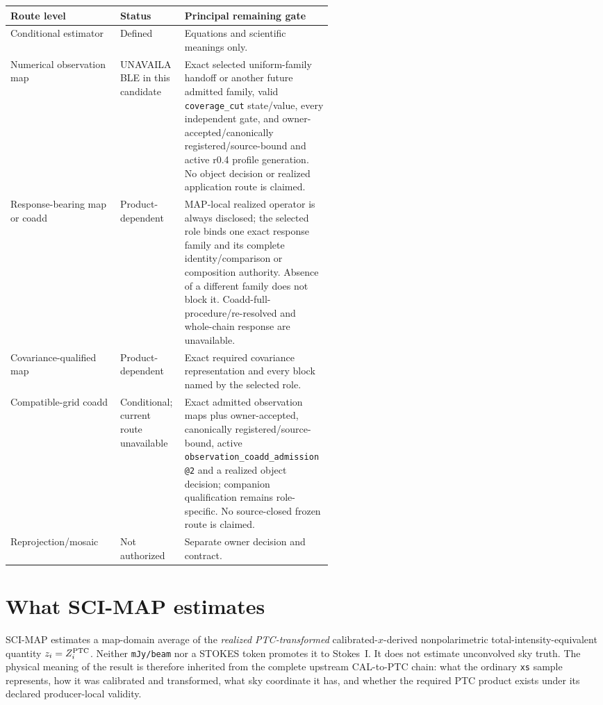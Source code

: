 \documentclass[10pt]{article}
\newcommand{\code}[1]{\nolinkurl{#1}}
\begin{document}
\begin{center}\small
\begin{tabularx}{0.96\linewidth}{@{}L{0.34\linewidth}L{0.20\linewidth}Y@{}}
\toprule Route level & Status & Principal remaining gate \\
\midrule
Conditional estimator & Defined & Equations and scientific meanings only.\\
Numerical observation map & UNAVAILABLE in this candidate & Exact selected uniform-family handoff or another future admitted family, valid \code{coverage_cut} state/value, every independent gate, and owner-accepted/canonically registered/source-bound and active r0.4 profile generation. No object decision or realized application route is claimed.\\
Response-bearing map or coadd & Product-dependent & MAP-local realized operator is always disclosed; the selected role binds one exact response family and its complete identity/comparison or composition authority. Absence of a different family does not block it. Coadd-full-procedure/re-resolved and whole-chain response are unavailable.\\
Covariance-qualified map & Product-dependent & Exact required covariance representation and every block named by the selected role.\\
Compatible-grid coadd & Conditional; current route unavailable & Exact admitted observation maps plus owner-accepted, canonically registered/source-bound, active \code{observation_coadd_admission@2} and a realized object decision; companion qualification remains role-specific. No source-closed frozen route is claimed.\\
Reprojection/mosaic & Not authorized & Separate owner decision and contract.\\
\bottomrule
\end{tabularx}
\end{center}

\SCIMapLifecycleDefinition

\SCIMapLifecycleTable

\SCIMapAxisSeparationDefinition

\SCIMapLifecycleAssumption

\tableofcontents

\clearpage
\section{What SCI-MAP estimates}\label{sec:estimand}
SCI-MAP estimates a map-domain average of the \emph{realized PTC-transformed}
calibrated-\(x\)-derived nonpolarimetric total-intensity-equivalent quantity
\(z_i=Z_i^{\rm PTC}\). Neither \code{mJy/beam} nor a STOKES token promotes it
to Stokes~I. It does not estimate unconvolved sky truth. The physical
meaning of the result is therefore inherited from the complete upstream
CAL-to-PTC chain: what the ordinary \code{xs} sample represents, how it was
calibrated and transformed, what sky coordinate it has, and whether the
required PTC product exists under its declared producer-local validity.
\end{document}
